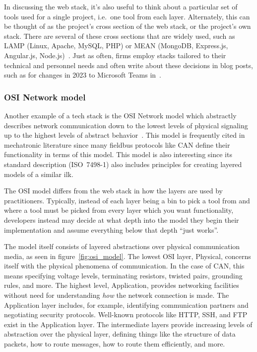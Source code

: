 \documentclass[english,12pt,a4paper,pdftex,eng,utf8]{aaltothesis}
\begin{document}
In discussing the web stack, it's also useful to think about a particular set of tools used for a single project, i.e.\ one tool from each layer. Alternately, this can be thought of as the project's cross section of the web stack, or the project's own stack. There are several of these cross sections that are widely used, such as LAMP (Linux, Apache, MySQL, PHP) or MEAN (MongoDB, Express.js, Angular.js, Node.js)~\cite{PranamStack2017}. Just as often, firms employ stacks tailored to their technical and personnel needs and often write about these decisions in blog posts, such as for changes in 2023 to Microsoft Teams in~\cite{Singh2023}.

\subsubsection{OSI Network model}

Another example of a tech stack is the OSI Network model which abstractly describes network communication down to the lowest levels of physical signaling up to the highest levels of abstract behavior~\cite{ISO7498-1}. This model is frequently cited in mechatronic literature since many fieldbus protocols like CAN define their functionality in terms of this model. This model is also interesting since its standard description (ISO~7498-1) also includes principles for creating layered models of a similar ilk.

The OSI model differs from the web stack in how the layers are used by practitioners. Typically, instead of each layer being a bin to pick a tool from and where a tool must be picked from every layer which you want functionality, developers instead may decide at what depth into the model they begin their implementation and assume everything below that depth ``just works''.

The model itself consists of layered abstractions over physical communication media, as seen in figure~\ref{fig:osi_model}. The lowest OSI layer, Physical, concerns itself with the physical phenomena of communication. In the case of CAN, this means specifying voltage levels, terminating resistors, twisted pairs, grounding rules, and more. The highest level, Application, provides networking facilities without need for understanding \textit{how} the network connection is made. The Application layer includes, for example, identifying communication partners and negotiating security protocols. Well-known protocols like HTTP, SSH, and FTP exist in the Application layer. The intermediate layers provide increasing levels of abstraction over the physical layer, defining things like the structure of data packets, how to route messages, how to route them efficiently, and more.
\end{document}
